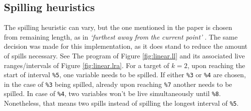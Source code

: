 \documentclass{article}
\begin{document}
\subsection{Spilling heuristics}
The spilling heuristic can vary, but the one mentioned in the paper is chosen from remaining length, as in  \textit{\textquoteleft furthest away from the current point\textquoteright} \cite[900]{linear}. The same decision was made for this implementation, as it does stand to reduce the amount of spills necessary. See The program of Figure \ref{fig:linear.ll} and its associated live ranges/intervals of Figure \ref{fig:linear.lra}. For a target of \(k=2\), upon reaching the start of interval \texttt{\%5},  one variable needs to be spilled. If either \texttt{\%3} or \texttt{\%4} are chosen, in the case of \texttt{\%3} being spilled, already upon reaching \texttt{\%7} another needs to be spilled. In case of \texttt{\%4}, two variables won't be live simultaneously until \texttt{\%8}. Nonetheless, that means two spills instead of spilling the longest interval of \texttt{\%5}.
\usetikzlibrary{chains,arrows}
\end{document}
